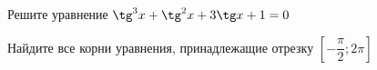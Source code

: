 \begin{ex}
	\begin{condition}
		\begin{enumcols}[label=\asbuk*)]
			\item Решите уравнение \( \tg^3 x +\tg^2 x + 3\tg x + 1=0 \)
			\item Найдите все корни уравнения, принадлежащие отрезку \( \left[-\dfrac{\pi}{2};2\pi\right] \)
		\end{enumcols}
	\end{condition}
\end{ex}